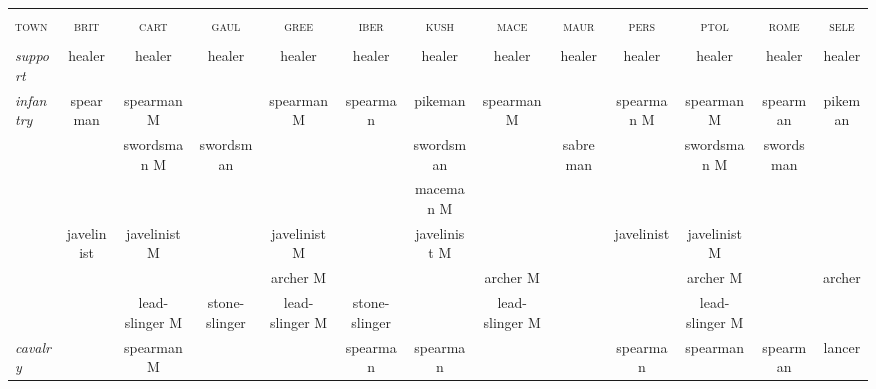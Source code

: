 \documentclass{article}
\newcommand{\brit}{\textsc{\color{blue} brit}}
\newcommand{\cart}{\textsc{\color{blue} cart}}
\newcommand{\gaul}{\textsc{\color{blue} gaul}}
\newcommand{\gree}{\textsc{\color{blue} gree}}
\newcommand{\iber}{\textsc{\color{blue} iber}}
\newcommand{\kush}{\textsc{\color{blue} kush}}
\newcommand{\mace}{\textsc{\color{blue} mace}}
\newcommand{\maur}{\textsc{\color{blue} maur}}
\newcommand{\pers}{\textsc{\color{blue} pers}}
\newcommand{\ptol}{\textsc{\color{blue} ptol}}
\newcommand{\rome}{\textsc{\color{blue} rome}}
\newcommand{\sele}{\textsc{\color{blue} sele}}
\newcommand{\town}{\textsc{\color{blue} town}}
\begin{document}
\begin{landscape}
\begin{tabular}{l||c|c|c|c||c|c|c|c||c|c|c|c}
\hline
\hline
 &                &                &                &                &                &                &                &                &                &                &                &                \\
\town %
 & \brit          & \cart          & \gaul          & \gree          & \iber          & \kush          & \mace          & \maur          & \pers          & \ptol          & \rome          & \sele          \\
 &                &                &                &                &                &                &                &                &                &                &                &                \\
\hline
\hline\textit{support}
 & healer         & healer         & healer         & healer         & healer         & healer         & healer         & healer         & healer         & healer         & healer         & healer         \\
\hline\textit{infantry}
 & spearman       & spearman M     &                & spearman M     & spearman       & pikeman        & spearman M     &                & spearman M     & spearman M     & spearman       & pikeman        \\
 &                & swordsman M    & swordsman      &                &                & swordsman      &                & sabreman       &                & swordsman M    & swordsman      &                \\
 &                &                &                &                &                & maceman M      &                &                &                &                &                &                \\
 & javelinist     & javelinist M   &                & javelinist M   &                & javelinist M   &                &                & javelinist     & javelinist M   &                &                \\
 &                &                &                & archer M       &                &                & archer M       &                &                & archer M       &                & archer         \\
 &                & lead-slinger M & stone-slinger  & lead-slinger M & stone-slinger  &                & lead-slinger M &                &                & lead-slinger M &                &                \\
\hline\textit{cavalry}
 &                & spearman M     &                &                & spearman       & spearman       &                &                & spearman       & spearman       & spearman       & lancer         \\

\end{tabular}
\end{landscape}
\end{document}
